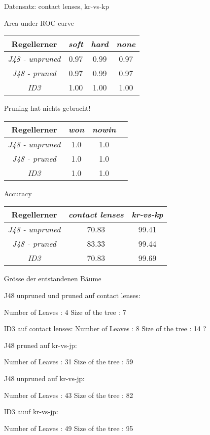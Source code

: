 
Datensatz: contact lenses, kr-vs-kp

Area under ROC curve

\begin{tabular}{c|c|c|c}
				Regellerner       & \emph{soft} & \emph{hard} & \emph{none}  \\ \hline
				\emph{J48 - unpruned} & 0.97 & 0.99 & 0.97  \\ \hline
				\emph{J48 - pruned}  & 0.97 & 0.99 & 0.97 \\ \hline
				\emph{ID3}  & 1.00 & 1.00 & 1.00 \\ \hline
\end{tabular}

Pruning hat nichts gebracht!


\begin{tabular}{c|c|c|c}
				Regellerner       & \emph{won} & \emph{nowin} \\ \hline
				\emph{J48 - unpruned} & 1.0 & 1.0  \\ \hline
				\emph{J48 - pruned}  & 1.0 & 1.0  \\ \hline
				\emph{ID3}  & 1.0 & 1.0 \\ \hline
\end{tabular}


Accuracy

\begin{tabular}{c|c|c}
				Regellerner       & \emph{contact lenses} & \emph{kr-vs-kp}  \\ \hline
				\emph{J48 - unpruned}  & 70.83 & 99.41 \\ \hline
				\emph{J48 - pruned} & 83.33  & 99.44 \\ \hline
				\emph{ID3}  & 70.83 & 99.69\\ \hline
\end{tabular}

Gr\"osse der entstandenen B\"aume

J48 unpruned und pruned auf contact lenses: 

Number of Leaves  : 	4
Size of the tree : 	7

ID3 auf contact lenses:
Number of Leaves : 8
Size of the tree : 14 ?

J48 pruned auf kr-vs-jp:

Number of Leaves  : 	31
Size of the tree : 	59

J48 unpruned auf kr-vs-jp:

Number of Leaves  : 	43
Size of the tree : 	82

ID3 auuf kr-vs-jp:

Number of Leaves : 49
Size of the tree : 95
